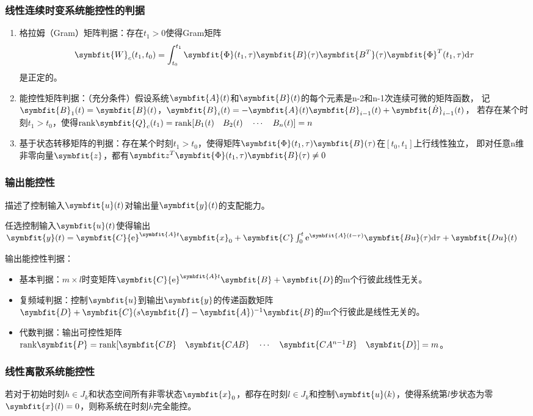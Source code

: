 \documentclass[11pt,a4paper]{ctexart}
\renewcommand{\d}{{\rm d}}
\newcommand{\e}{{\rm e}}
\newcommand{\bm}{\symbfit}
\begin{document}
        \subsubsection{线性连续时变系统能控性的判据}
            \begin{enumerate}
                \item 格拉姆（Gram）矩阵判据：存在$t_1>0$使得Gram矩阵
                \[
                \bm{W}_c(t_1,t_0)=\int_{t_0}^{t_1}\bm{\Phi}(t_1,\tau)\bm{B}(\tau)\bm{B^T}(\tau)\bm{\Phi}^T(t_1,\tau)\d\tau
                \]
                是正定的。
                \item 能控性矩阵判据：（充分条件）假设系统$\bm{A}(t)$和$\bm{B}(t)$的每个元素是n-2和n-1次连续可微的矩阵函数，
                记$\bm{B}_1(t)=\bm{B}(t)$，$\bm{B}_i(t)=-\bm{A}(t)\bm{B}_{i-1}(t)+\bm{\dot B}_{i-1}(t)$，
                若存在某个时刻$t_1>t_0$，使得${\rm rank}\bm{Q}_c(t_1)={\rm rank}[B_1(t)\quad B_2(t)\quad\cdots\quad B_n(t)]=n$    
                \item 基于状态转移矩阵的判据：存在某个时刻$t_1>t_0$，使得矩阵$\bm{\Phi}(t_1,\tau)\bm{B}(\tau)$在$[t_0,t_1]$上行线性独立，
                即对任意n维非零向量$\bm{z}$，都有$\bm z^T\bm{\Phi}(t_1,\tau)\bm{B}(\tau)\neq0$
            \end{enumerate}
            
        \subsubsection{输出能控性}
            描述了控制输入$\bm{u}(t)$对输出量$\bm{y}(t)$的支配能力。
            
            任选控制输入$\bm{u}(t)$使得输出$\bm{y}(t)=\bm{C}\e^{\bm{A}t}\bm{x}_0+\bm{C}\int_0^{t}\e^{\bm{A}(t-\tau)}\bm{Bu}(\tau)\d\tau+\bm{Du}(t)$

            输出能控性判据：
            \begin{itemize}
                \item 基本判据：$m\times l$时变矩阵$\bm{C}\e^{\bm{A}t}\bm{B}+\bm{D}$的m个行彼此线性无关。
                \item 复频域判据：控制$\bm{u}$到输出$\bm{y}$的传递函数矩阵$\bm{D}+\bm{C}(s\bm{I}-\bm{A})^{-1}\bm{B}$的m个行彼此是线性无关的。
                \item 代数判据：输出可控性矩阵${\rm rank}\bm{P}={\rm rank}[\bm{CB}\quad\bm{CAB}\quad\cdots\quad\bm{CA^{n-1}B}\quad\bm{D}]=m$。
            \end{itemize}
        \subsubsection{线性离散系统能控性}
            若对于初始时刻$h\in J_k$和状态空间所有非零状态$\bm{x}_0$，都存在时刻$l\in J_k$和控制$\bm{u}(k)$，使得系统第$l$步状态为零$\bm{x}(l)=0$，则称系统在时刻$h$完全能控。
\end{document}
